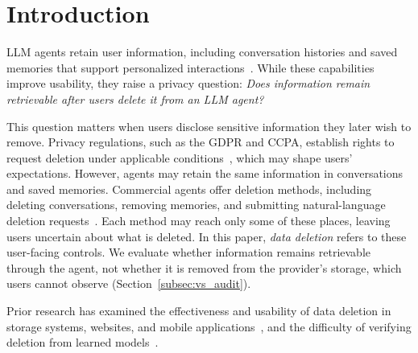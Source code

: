 
\section{Introduction}
\label{sec:intro}

LLM agents retain user information, including conversation histories and saved memories that support personalized interactions~\cite{chen2026relational,zhang2025understanding}.
%
While these capabilities improve usability, they raise a privacy question: \textit{Does information remain retrievable after users delete it from an LLM agent?}
%

%
%

This question matters when users disclose sensitive information they later wish to remove.
%
Privacy regulations, such as the GDPR and CCPA, establish rights to request deletion under applicable conditions~\cite{gdpr2016,ccpa2018}, which may shape users' expectations.
%
However, agents may retain the same information in conversations and saved memories.
%
Commercial agents offer deletion methods, including deleting conversations, removing memories, and submitting natural-language deletion requests~\cite{li2026privacy}.
%
Each method may reach only some of these places, leaving users uncertain about what is deleted.
%
In this paper, \textit{data deletion} refers to these user-facing controls. We evaluate whether information remains retrievable through the agent, not whether it is removed from the provider's storage, which users cannot observe (Section~\ref{subsec:vs_audit}).


Prior research has examined the effectiveness and usability of data deletion in storage systems, websites, and mobile applications~\cite{reardon2013sok,habib2019empirical,rupp2022leave,yan2025sign}, and the difficulty of verifying deletion from learned models~\cite{thudi2022necessity,xue2026towards}.

